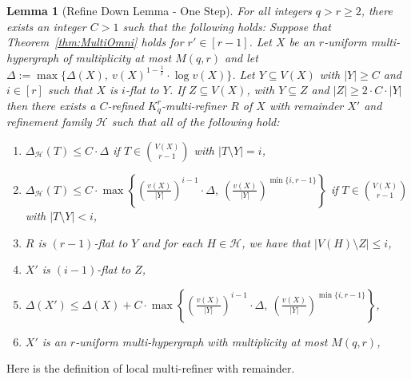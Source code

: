 \documentclass[11pt]{article}
\newcounter{i}
\theoremstyle{plain}
\newtheorem{lem}[thm]{Lemma}
\theoremstyle{plain} %
\theoremstyle{definition}
\begin{document}
\begin{lem}[Refine Down Lemma - One Step]\label{lem:RefineDownOneStep}
For all integers $q > r\ge 2$, there exists an integer $C > 1$ such that the following holds: Suppose that Theorem~\ref{thm:MultiOmni} holds for $r'\in [r-1]$. Let $X$ be an $r$-uniform multi-hypergraph of multiplicity at most $M(q,r)$ and let $\Delta:=\max\{\Delta(X),~v(X)^{1-\frac{1}{r}}\cdot \log v(X)\}$. Let $Y\subseteq V(X)$ with $|Y|\ge C$ and $i\in [r]$ such that $X$ is $i$-flat to $Y$. If $Z\subseteq V(X)$, with $Y\subseteq Z$ and $|Z|\ge 2\cdot C\cdot |Y|$ then there exists a $C$-refined $K_q^r$-multi-refiner $R$ of $X$ with remainder $X'$ and refinement family $\mathcal{H}$ such that all of the following hold:

\begin{enumerate}
    \item[(1)] $\Delta_{\mathcal{H}}(T) \le C \cdot \Delta$ if $T\in \binom{V(X)}{r-1}$ with $|T\setminus Y|=i$,
    \item[(2)] $\Delta_{\mathcal{H}}(T) \le C \cdot \max\left\{\left(\frac{v(X)}{|Y|}\right)^{i-1} \cdot \Delta,~\left(\frac{v(X)}{|Y|}\right)^{\min\{i,r-1\}}\right\}$ if $T\in \binom{V(X)}{r-1}$ with $|T\setminus Y|<i$,
    \item[(3)] $R$ is $(r-1)$-flat to $Y$ and for each $H\in \mathcal{H}$, we have that $|V(H)\setminus Z| \le i$, 
    \item[(4)] $X'$ is $(i-1)$-flat to $Z$,
    \item[(5)] $\Delta(X') \le \Delta(X) + C \cdot \max\left\{\left(\frac{v(X)}{|Y|}\right)^{i-1} \cdot \Delta,~\left(\frac{v(X)}{|Y|}\right)^{\min\{i,r-1\}}\right\}$,
    \item[(6)] $X'$ is an $r$-uniform multi-hypergraph with multiplicity at most $M(q,r)$,
\end{enumerate}          
\end{lem}

Here is the definition of local multi-refiner with remainder.
\end{document}

